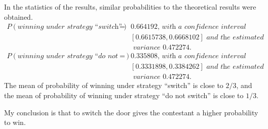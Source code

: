 \documentclass[12pt]{article}
\begin{document}
In the statistics of the results, similar probabilities to the theoretical results were obtained.
\begin{eqnarray}P(\textit{winning under strategy ``switch''}) & = & 0.664192\textit{, with a confidence interval } \nonumber \\
& & [0.6615738, 0.6668102] \textit{ and the estimated } \nonumber \\
& & \textit{ variance } 0.472274. \nonumber \\
P(\textit{winning under strategy ``do not switch''}) & = & 0.335808\textit{, with a confidence interval } \nonumber \\
& & [0.3331898, 0.3384262] \textit{ and the estimated } \nonumber \\
& &\textit{ variance } 0.472274. \nonumber \end{eqnarray}
The mean of probability of winning under strategy ``switch'' is close to $2/3$, and the mean of probability of winning under strategy ``do not 
switch'' is close to $1/3$. 

My conclusion is that to switch the door gives the contestant a higher probability to win.
\end{document}
